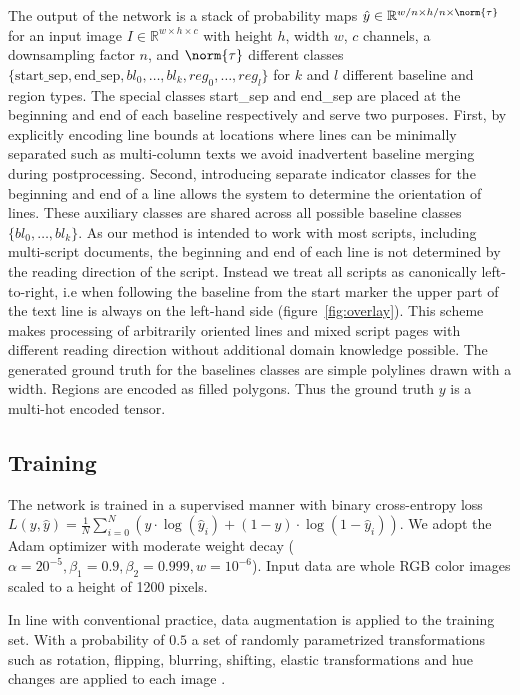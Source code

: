 The output of the network is a stack of probability maps $\hat{y} \in
\mathbb{R}^{w/n \times h/n \times \norm{\tau}}$ for an input image $I \in
\mathbb{R}^{w\times h\times c}$ with height $h$, width $w$, $c$ channels, a
downsampling factor $n$, and $\norm{\tau}$ different classes $\{\text{start\_sep},
\text{end\_sep}, bl_0, \dots, bl_k, reg_0, \dots, reg_l\}$ for $k$ and $l$ different
baseline and region types. The special classes start\_sep and end\_sep are
placed at the beginning and end of each baseline respectively and serve two
purposes. First, by explicitly encoding line bounds at locations where lines
can be minimally separated such as multi-column texts we avoid inadvertent
baseline merging during postprocessing. Second, introducing separate indicator
classes for the beginning and end of a line allows the system to determine the
orientation of lines. These auxiliary classes are shared across all possible
baseline classes $\{bl_0, \dots, bl_k\}$. As our method is intended to work
with most scripts, including multi-script documents, the beginning and end of
each line is not determined by the reading direction of the script. Instead we
treat all scripts as canonically left-to-right, i.e when following the baseline
from the start marker the upper part of the text line is always on the
left-hand side (figure~\ref{fig:overlay}). This scheme makes processing of
arbitrarily oriented lines and mixed script pages with different reading
direction without additional domain knowledge possible. The generated ground
truth for the baselines classes are simple polylines drawn with a width.
Regions are encoded
as filled polygons. Thus the ground truth $y$ is a multi-hot encoded tensor.

\subsection{Training}



The network is trained in a supervised manner with binary cross-entropy loss
$L(y, \hat{y}) = \frac{1}{N}\sum^N_{i=0}(y\cdot \log(\hat{y}_i)+(1-y)\cdot
\log(1-\hat{y}_i))$. We adopt the Adam optimizer with moderate weight decay
($\alpha = 20^{-5}, \beta_1 = 0.9, \beta_2 = 0.999, w = 10^{-6}$). Input data
are whole RGB color images scaled to a height of 1200 pixels.

In line with conventional practice, data augmentation is applied to the
training set. With a probability of $0.5$ a set of randomly parametrized
transformations such as rotation, flipping, blurring, shifting, elastic
transformations and hue changes are applied to each image \cite{info11020125}.

